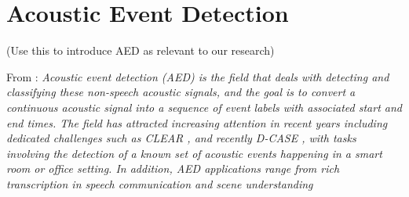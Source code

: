 \documentclass[12pt]{llncs}
\begin{document}
\section{Acoustic Event Detection}
\label{sec:AED}
(Use this to introduce AED as relevant to our research)

From \cite{espi2015exploiting}:
\emph{Acoustic event detection (AED) is the field that deals
with detecting and classifying these non-speech acoustic
signals, and the goal is to convert a continuous acoustic
signal into a sequence of event labels with associated
start and end times. The field has attracted increasing
attention in recent years including dedicated challenges
such as CLEAR \cite{mostefa2007chil}, and recently D-CASE \cite{giannoulis2013detection}, with tasks
involving the detection of a known set of acoustic events
happening in a smart room or office setting. In addition,
AED applications range from rich transcription in
speech communication \cite{mostefa2007chil,giannoulis2013detection} and scene understanding}
\end{document}
